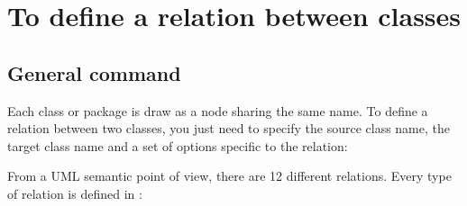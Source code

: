 \documentclass[a4paper,11pt]{report}
\begin{document}
\medskip

\begin{minipage}{0.5\textwidth}

\end{minipage}
\begin{minipage}{0.4\textwidth}
\begin{center}
\end{center}
\end{minipage}

\section{To define a relation between classes}\label{s.rel}

\subsection{General command}\label{ss.relgen}

Each class or package is draw as a node sharing the same name. To define a relation
between two classes, you just need to specify the source class name, the target class name and a set of options specific to the relation:

\medskip

\begin{minipage}{0.5\textwidth}

\end{minipage}
\begin{minipage}{0.4\textwidth}
\begin{center}
\end{center}
\end{minipage}

From a UML semantic point of view, there are 12 different relations. Every type of relation is defined in \tuml:
\end{document}
